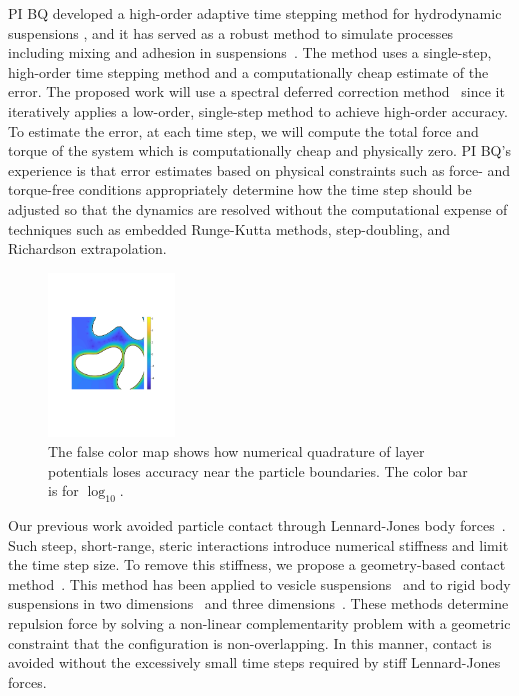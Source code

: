 PI BQ developed a high-order adaptive time stepping method for
hydrodynamic suspensions \cite{qua-bir2016}, and it has served as a
robust method to simulate processes including mixing and adhesion in
suspensions~\cite{qua-vee-you2019, kab-qua-bir2017}. The method uses
a single-step, high-order time stepping method and a computationally
cheap estimate of the error. The proposed work will use a spectral
deferred correction method~\cite{dut-gre-rok2000} since it iteratively
applies a low-order, single-step method to achieve high-order accuracy.
To estimate the error, at each time step, we will compute the total force
and torque of the system which is computationally cheap and physically
zero. PI BQ's experience is that error estimates based on physical
constraints such as force- and torque-free conditions appropriately
determine how the time step should be adjusted so that the dynamics are
resolved without the computational expense of techniques such as
embedded Runge-Kutta methods, step-doubling, and Richardson
extrapolation.

%
\begin{figure}
\centerline{\includegraphics[width=0.30\textwidth]{figures/BIError.pdf}}
  \vspace{-8pt}
\caption{
\label{fig:bierror}  
\footnotesize The false color map shows how numerical quadrature of
  layer potentials loses accuracy near the particle boundaries.  The
  color bar is for $\log_{10}.$}
\end{figure}
%
Our previous work avoided particle contact through Lennard-Jones body
forces~\cite{Fu2018_SIAM}. Such steep, short-range, steric interactions 
introduce numerical stiffness and limit the time step size. To
remove this stiffness, we propose a geometry-based contact
method~\cite{har-pon-sor-zor2011}. This method has been applied to
vesicle suspensions~\cite{lu-rah-zor2017} and to rigid body suspensions in
two dimensions~\cite{bys-sha-qua2020} and three
dimensions~\cite{Yan2019}. These methods determine repulsion force by
solving a non-linear complementarity problem with a geometric constraint
that the configuration is non-overlapping. In this manner, contact is
avoided without the excessively small time steps required by stiff
Lennard-Jones forces.

